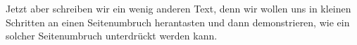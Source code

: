 \documentclass[a5paper]{article}
\begin{document}

\blindtext

\blindtext

Jetzt aber schreiben wir ein wenig anderen Text, denn wir wollen uns in kleinen Schritten an einen
Seitenumbruch herantasten und dann demonstrieren, wie ein solcher Seitenumbruch unterdrückt werden kann.
\end{document}

